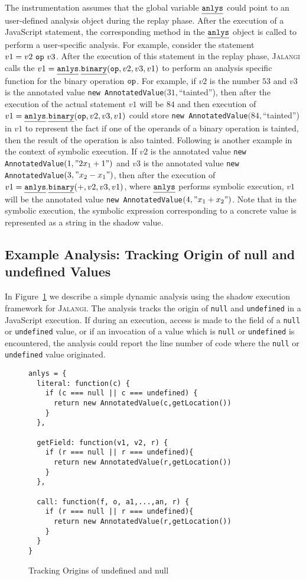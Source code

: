 \documentclass{sig-alternate}
\def\jalangi{\textsc{Jalangi}}
\newcommand \dsl [1] {\ensuremath{{\tt #1}}\xspace}
\newcommand \usl [1] {\mbox{\underline{\tt #1}}\xspace}
\newcommand \analysis{\usl{anlys}}
\begin{document}
The instrumentation assumes that the global variable $\analysis$ could
point to an user-defined analysis object during the replay phase.
After the execution of a JavaScript statement, the corresponding
method in the $\analysis$ object is called to perform a user-specific
analysis.  For example, consider the statement $v1 = v2\ \dsl{op}\
v3$.  After the execution of this statement in the replay phase,
\jalangi{} calls the $v1 = \analysis.\usl{binary}(\dsl{op}, v2, v3,
v1)$ to perform an analysis specific function for the binary operation
$\dsl{op}$.  For example, if $v2$ is the number $53$ and $v3$ is the
annotated value \texttt{new AnnotatedValue}$(31,$``tainted''), then
after the execution of the actual statement $v1$ will be $84$ and then
execution of $v1 = \analysis.\usl{binary}(\dsl{op}, v2, v3, v1)$ could
store \texttt{new AnnotatedValue}$(84,$``tainted'') in $v1$ to
represent the fact if one of the operands of a binary operation is
tainted, then the result of the operation is also tainted.  Following
is another example in the context of symbolic execution.  If $v2$ is
the annotated value \texttt{new AnnotatedValue}$(1, "2x_1+1")$ and
$v3$ is the annotated value \texttt{new AnnotatedValue}$(3,
"x_2-x_1")$, then after the execution of $v1 =
\analysis.\usl{binary}(+, v2, v3, v1)$, where $\analysis$ performs
symbolic execution, $v1$ will be the annotated value \texttt{new
  AnnotatedValue}$(4, "x_1+x_2")$.  Note that in the symbolic
execution, the symbolic expression corresponding to a concrete value
is represented as a string in the shadow value.

\subsection{Example Analysis: Tracking Origin of null and undefined Values}
\label{sec:example-analysis}

In Figure~\ref{fig:lib3} we describe a simple dynamic analysis using
the shadow execution framework for \jalangi{}.  The analysis tracks
the origin of \texttt{null} and \texttt{undefined} in a JavaScript
execution.  If during an execution, access is made to the field of a
\texttt{null} or \texttt{undefined} value, or if an invocation of a
value which is \texttt{null} or \texttt{undefined} is encountered, the
analysis could report the line number of code where the \texttt{null}
or \texttt{undefined} value originated.

\begin{figure}
 {\small 
\begin{lstlisting}
anlys = {
  literal: function(c) {
    if (c === null || c === undefined) {
      return new AnnotatedValue(c,getLocation())
    }
  },

  getField: function(v1, v2, r) {
    if (r === null || r === undefined){
      return new AnnotatedValue(r,getLocation())
    }
  },

  call: function(f, o, a1,...,an, r) {
    if (r === null || r === undefined){
      return new AnnotatedValue(r,getLocation())
    }
  }
}
\end{lstlisting}
}
  \caption{Tracking Origins of undefined and null}
  \label{fig:lib3}
\end{figure}
\end{document}
